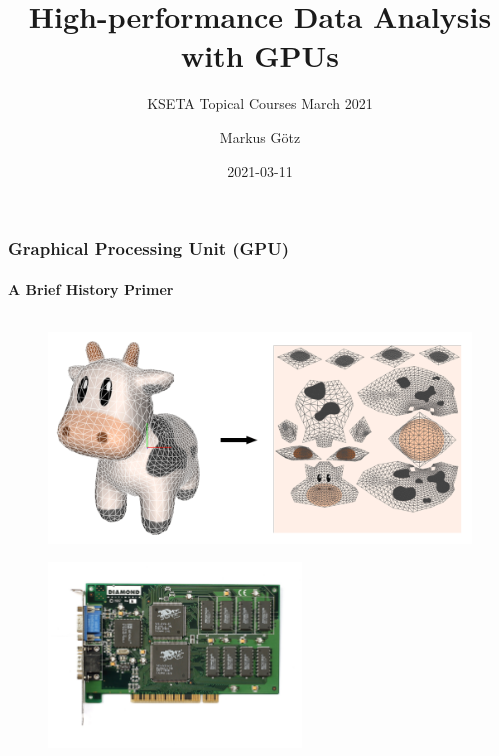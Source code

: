 \documentclass[aspectratio=1610]{beamer}
\title{High-performance Data Analysis with GPUs}
\subtitle{KSETA Topical Courses March 2021}
\author{Markus Götz}
\date{2021-03-11}
\institute{Karlsruhe Institute of Technology (KIT)}
\begin{document}
\maketitle

\begin{frame}
    \frametitle{Graphical Processing Unit (GPU)}
    \framesubtitle{A Brief History Primer}
    
    \begin{columns}
        \begin{column}{0.48\textwidth}
            \begin{figure}
                \centering
                \includegraphics[width=0.8\linewidth]{images/cg.png}
                
            \end{figure}
            \begin{figure}
                \centering
                \includegraphics[width=0.6\textwidth]{images/voodoo.jpg}
                

\end{figure}
\end{column}
\end{columns}
\end{frame}
\end{document}

